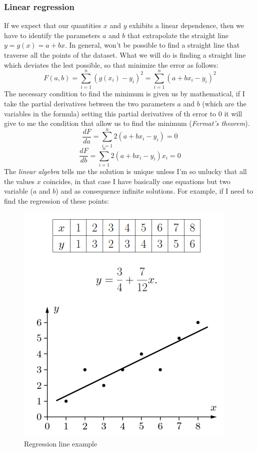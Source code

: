 \documentclass{article}
\begin{document}
\subsubsection{Linear regression}
If we expect that our quantities $x$ and $y$ exhibits a linear dependence, then we have
to identify the parameters $a$ and $b$ that extrapolate the straight line $y=g(x)=a+bx$.
In general, won't be possible to find a straight line that traverse all the points of the
dataset. What we will do is finding a straight line which deviates the lest possible,
so that minimize the error as follows:
$$F(a,b)=\sum_{i=1}^{n}(g(x_i)-y_i)^2=\sum_{i=1}^n(a+bx_i-y_i)^2$$
The necessary condition to find the minimum is given us by mathematical, if I take the
partial derivatives between the two parameters $a$ and $b$ (which are the variables
in the formula) setting this partial derivatives of th error to $0$ it will give to
me the condition that allow us to find the minimum (\textit{Fermat's theorem}).
$$\frac{dF}{da}=\sum_{i=1}^{n}2(a+bx_i-y_i)=0$$
$$\frac{dF}{db}=\sum_{i=1}^{n}2(a+bx_i-y_i)x_i=0$$
The \textit{linear algebra} tells me the solution is unique unless I'm so unlucky that
all the values $x$ coincides, in that case I have basically one equations but
two variable ($a$ and $b$) and as consequence infinite solutions.
\newline\newline
For example, if I need to find the regression of these points:
\begin{figure}[H]
    \centering
    \includegraphics[scale=0.7]{images/regression_line.png}
    \caption{Regression line example}
    \label{fig:regression_line}
\end{figure}
\end{document}
